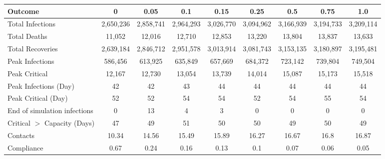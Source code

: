 \begin{table}[ht]
\centering
\begin{tabular}{lcccccccc}
  \toprule
Outcome & 0 & 0.05 & 0.1 & 0.15 & 0.25 & 0.5 & 0.75 & 1.0 \\ 
  \midrule
Total Infections & 2,650,236 & 2,858,741 & 2,964,293 & 3,026,770 & 3,094,962 & 3,166,939 & 3,194,733 & 3,209,114 \\ 
  Total Deaths &    11,052 &    12,016 &    12,710 &    12,853 &    13,220 &    13,804 &    13,837 &    13,633 \\ 
  Total Recoveries & 2,639,184 & 2,846,712 & 2,951,578 & 3,013,914 & 3,081,743 & 3,153,135 & 3,180,897 & 3,195,481 \\ 
  Peak Infections &   586,456 &   613,925 &   635,849 &   657,669 &   684,372 &   723,142 &   739,804 &   749,504 \\ 
  Peak Critical &    12,167 &    12,730 &    13,054 &    13,739 &    14,014 &    15,087 &    15,173 &    15,518 \\ 
  Peak Infections (Day) &        42 &        42 &        43 &        44 &        44 &        44 &        44 &        44 \\ 
  Peak Critical (Day) &        52 &        52 &        54 &        54 &        52 &        54 &        55 &        54 \\ 
  End of simulation infections &         0 &        13 &         4 &         3 &         0 &         0 &         0 &         0 \\ 
  Critical $>$ Capacity (Days) &        47 &        49 &        51 &        50 &        50 &        49 &        50 &        49 \\ 
  Contacts &     10.34 &     14.56 &     15.49 &     15.89 &     16.27 &     16.67 &      16.8 &     16.87 \\ 
  Compliance &      0.67 &      0.24 &      0.16 &      0.13 &       0.1 &      0.07 &      0.06 &      0.05 \\ 
   \bottomrule
\end{tabular}
\end{table}
